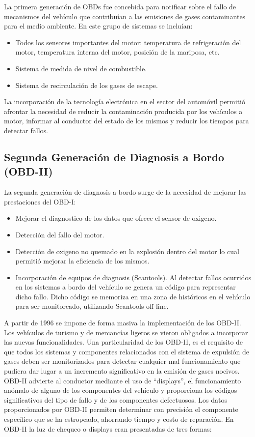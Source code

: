 La primera generación de OBDs fue concebida para notificar sobre el fallo de mecanismos del vehículo que contribuían a las emisiones de gases contaminantes para el medio ambiente. 
En este grupo de sistemas se incluían:

\begin{itemize}
\item Todos los sensores importantes del motor: temperatura de refrigeración del motor, temperatura interna del motor, posición de la mariposa, etc.
\item Sistema de medida de nivel de combustible.
\item Sistema de recirculación de los gases de escape.
\end{itemize}

La incorporación de la tecnología electrónica en el sector del automóvil permitió afrontar la necesidad de reducir la contaminación producida por los vehículos a motor, informar al conductor del estado de los mismos y reducir los tiempos para detectar fallos.

\subsection {Segunda Generación de Diagnosis a Bordo (OBD-II)}
La segunda generación de diagnosis a bordo surge de la necesidad de mejorar las prestaciones del OBD-I:

\begin {itemize}
\item Mejorar el diagnostico de los datos que ofrece el sensor de oxigeno.
\item Detección del fallo del motor.
\item Detección de oxigeno no quemado en la explosión dentro del motor lo cual permitió mejorar la eficiencia de los mismos.
\item Incorporación de equipos de diagnosis (Scantools). 
Al detectar fallos ocurridos en los sistemas a bordo del vehículo se genera un código para representar dicho fallo. 
Dicho código se memoriza en una zona de históricos en el vehículo para ser monitoreado, utilizando Scantools off-line. 
\end{itemize}

A partir de 1996 se impone de forma masiva la implementación de los OBD-II. 
Los vehículos de turismo y de mercancías ligeros se vieron obligados a incorporar las nuevas funcionalidades. 
Una particularidad de los OBD-II, es el requisito de que todos los sistemas y componentes relacionados con el sistema de expulsión de gases deben ser monitorizados para detectar cualquier mal funcionamiento que pudiera dar lugar a un incremento significativo en la emisión de gases nocivos. 
OBD-II advierte al conductor mediante  el uso de “displays”, el funcionamiento anómalo de alguno de los componentes del vehículo y proporciona los códigos significativos del tipo de fallo y de los componentes defectuosos. 
Los datos proporcionados por OBD-II permiten determinar con precisión el componente específico que se ha estropeado, ahorrando tiempo y costo de reparación. 
En OBD-II la luz de chequeo o displays eran presentadas de tres formas:


